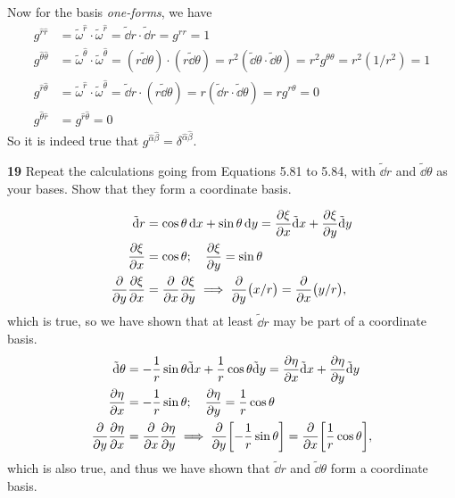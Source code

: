 \documentclass[gr-notes.tex]{subfiles}
\begin{document}
Now for the basis \emph{one-forms}, we have
%
\begin{align*}
  g^{\hat{r} \hat{r}} &=
  \tilde\omega^{\hat{r}} \cdot \tilde\omega^{\hat{r}} =
  \tilde\dd{r} \cdot \tilde\dd{r} =
  g^{rr} =
  1
  \\
  g^{\hat\theta \hat\theta} &=
  \tilde\omega^{\hat\theta} \cdot \tilde\omega^{\hat\theta} =
  (r \tilde\dd\theta) \cdot (r \tilde\dd\theta) =
  r^2 (\tilde\dd\theta \cdot \tilde\dd\theta) =
  r^2 g^{\theta\theta} =
  r^2 (1/r^2) =
  1
  \\
  g^{\hat{r} \hat\theta} &=
  \tilde\omega^{\hat{r}} \cdot \tilde\omega^{\hat\theta} =
  \tilde\dd{r} \cdot (r \tilde\dd\theta) =
  r (\tilde\dd{r} \cdot \tilde\dd\theta) =
  r g^{r\theta} =
  0
  \\
  g^{\hat\theta \hat{r}} &=
  g^{\hat{r} \hat\theta} =
  0
\end{align*}
%
So it is indeed true that $g^{\hat\alpha \hat\beta} = \delta^{\hat\alpha \hat\beta}$.



\textbf{19}
Repeat the calculations going from Equations 5.81 to 5.84, with $\tilde\dd{r}$ and $\tilde\dd\theta$ as your bases. Show that they form a coordinate basis.

\begin{align*}
  \tilde\dd{r} &=
  \cos\theta \dd{x} + \sin\theta \dd{y} =
  \pdv{\xi}{x} \tilde\dd{x} + \pdv{\xi}{y} \tilde\dd{y}
  \\
  \pdv{\xi}{x} &=
  \cos\theta; \quad
  \pdv{\xi}{y} =
  \sin\theta
  \\
  \pdv{y} \pdv{\xi}{x} &=
  \pdv{x} \pdv{\xi}{y} \implies
  \pdv{y} (x/r) = \pdv{x} (y/r),
\end{align*}
%
which is true, so we have shown that at least $\tilde\dd{r}$ may be part of a coordinate basis.
%
\begin{align*}
  \tilde\dd\theta &=
  -\frac{1}{r} \sin\theta \tilde\dd{x} +
   \frac{1}{r} \cos\theta \tilde\dd{y} =
  \pdv{\eta}{x} \tilde\dd{x} +
  \pdv{\eta}{y} \tilde\dd{y}
  \\
  \pdv{\eta}{x} &=
  -\frac{1}{r} \sin\theta; \quad
  \pdv{\eta}{y} =
   \frac{1}{r} \cos\theta
  \\
  \pdv{y} \pdv{\eta}{x} &=
  \pdv{x} \pdv{\eta}{y} \implies
  \pdv{y} \qty[ -\frac{1}{r} \sin\theta ] =
  \pdv{x} \qty[  \frac{1}{r} \cos\theta ],
\end{align*}
%
which is also true, and thus we have shown that $\tilde\dd{r}$ and $\tilde\dd\theta$ form a coordinate basis.
\end{document}
